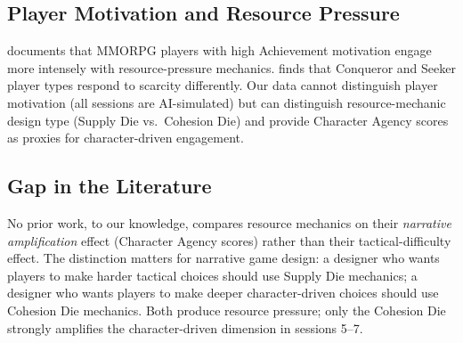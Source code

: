 \subsection{Player Motivation and Resource Pressure}

\citet{yee2006motivations} documents that MMORPG players with high Achievement motivation
engage more intensely with resource-pressure mechanics. \citet{nacke2011brainhex}
finds that Conqueror and Seeker player types respond to scarcity differently. Our
data cannot distinguish player motivation (all sessions are AI-simulated) but can
distinguish resource-mechanic design type (Supply Die vs.\ Cohesion Die) and
provide Character Agency scores as proxies for character-driven engagement.

\subsection{Gap in the Literature}

No prior work, to our knowledge, compares resource mechanics on their
\textit{narrative amplification} effect (Character Agency scores) rather than their
tactical-difficulty effect. The distinction matters for narrative game design:
a designer who wants players to make harder tactical choices should use Supply Die
mechanics; a designer who wants players to make deeper character-driven choices
should use Cohesion Die mechanics. Both produce resource pressure; only the Cohesion
Die strongly amplifies the character-driven dimension in sessions 5--7.
